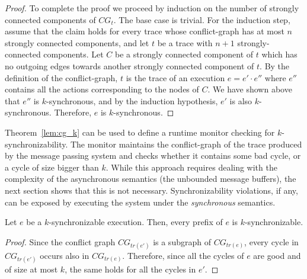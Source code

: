 \begin{proof}
To complete the proof we proceed by induction on the number of strongly connected components of $CG_t$. The base case is trivial. 
 For the induction step, assume that the claim holds for every trace whose conflict-graph has at most $n$ strongly connected components, and 
 let $t$ be a trace with $n+1$ strongly-connected components.  
 Let $C$ be a strongly connected component of $t$ which has no outgoing edges towards another strongly connected component of $t$. 
 By the definition of the conflict-graph, $t$ is the trace of an execution $e=e'\cdot e''$ where $e''$ contains all the actions corresponding to the nodes of $C$. 
 We have shown above that $e''$ is $k$-synchronous, and by the induction hypothesis, $e'$ is also $k$-synchronous. Therefore, $e$ is $k$-synchronous.
\end{proof}

Theorem~\ref{lem:cg_k} can be used to define a runtime monitor checking for $k$-synchronizability. 
The monitor maintains the conflict-graph of the trace produced by the message passing system and checks whether it contains some bad cycle, or a cycle of size bigger than $k$.
While this approach requires dealing with the complexity of the asynchronous semantics (the unbounded message buffers), the next section shows that this is not necessary. Synchronizability violations, if any, can be exposed by executing the system under the \emph{synchronous} semantics.

\begin{lemma}\label{lem:pref_closed}
Let $e$ be a $k$-synchronizable execution. Then, every prefix of $e$ is $k$-synchronizable. 
\end{lemma}
\begin{proof}
Since the conflict graph $CG_{tr(e')}$ is a subgraph of $CG_{tr(e)}$, every cycle in $CG_{tr(e')}$ occurs also in $CG_{tr(e)}$. Therefore, since all the cycles of $e$ are good and of size at most $k$, the same holds for all the cycles in $e'$.
\end{proof}


